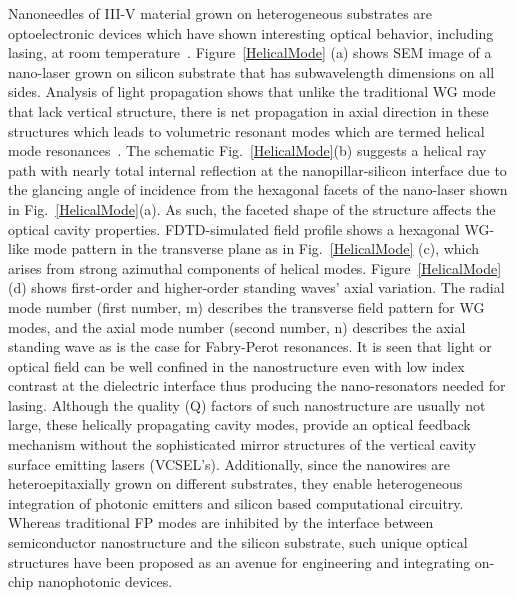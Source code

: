 Nanoneedles of III-V material grown on heterogeneous substrates are
optoelectronic devices which have shown interesting optical behavior, including
lasing, at room temperature~\cite{Chen:2011cg}. Figure~\ref{HelicalMode} (a)
shows SEM image of a nano-laser grown on silicon substrate that has
subwavelength dimensions on all sides. Analysis of light propagation shows that
unlike the traditional WG mode that lack vertical structure, there is net
propagation in axial direction in these structures which leads to volumetric
resonant modes which are termed helical mode resonances~\cite{Chen:2011cg}. The
schematic Fig.~\ref{HelicalMode}(b) suggests a helical ray path with nearly
total internal reflection at the nanopillar-silicon interface due to the
glancing angle of incidence from the hexagonal facets of the nano-laser shown
in Fig.~\ref{HelicalMode}(a). As such, the faceted shape of the structure
affects the optical cavity properties. FDTD-simulated field profile shows a
hexagonal WG-like mode pattern  in the transverse plane as in
Fig.~\ref{HelicalMode} (c), which arises from strong azimuthal components of
helical modes.  Figure~\ref{HelicalMode} (d) shows first-order and higher-order
standing waves’ axial variation. The radial mode number (first number, m)
describes the transverse field pattern for WG modes, and the axial mode number
(second number, n) describes the axial standing wave as is the case for
Fabry-Perot resonances. It is seen that light or optical field can be well
confined in the nanostructure even with low index contrast at the dielectric
interface thus producing the nano-resonators needed for lasing. Although the
quality (Q) factors of such nanostructure are usually not large, these
helically propagating cavity modes, provide an optical feedback mechanism
without the sophisticated mirror structures of the vertical cavity surface
emitting lasers (VCSEL's). Additionally, since the nanowires are
heteroepitaxially grown on different substrates, they enable heterogeneous
integration of photonic emitters and silicon based computational circuitry.
Whereas traditional FP modes are inhibited by the interface between
semiconductor nanostructure and the silicon substrate, such unique optical
structures have been proposed as an avenue for engineering and integrating
on-chip nanophotonic devices.

